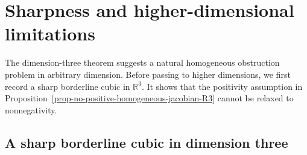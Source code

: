 \documentclass[10pt]{amsart}
\numberwithin{equation}{section}
\theoremstyle{definition}
\newcommand{\R}{\mathbb R}
\begin{document}
\section{Sharpness and higher-dimensional limitations}
\label{sec-higher}

The dimension-three theorem suggests a natural homogeneous obstruction
problem in arbitrary dimension. Before passing to higher dimensions, we first
record a sharp borderline cubic in \(\R^3\). It shows that the positivity
assumption in Proposition~\ref{prop-no-positive-homogeneous-jacobian-R3} cannot
be relaxed to nonnegativity.

\subsection{A sharp borderline cubic in dimension three}
\end{document}
